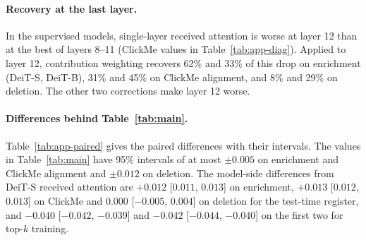 \paragraph{Recovery at the last layer.} In the supervised models, single-layer received attention is worse at layer 12 than at the best of layers 8--11 (ClickMe values in Table~\ref{tab:app-diag}). Applied to layer 12, contribution weighting recovers 62\% and 33\% of this drop on enrichment (DeiT-S, DeiT-B), 31\% and 45\% on ClickMe alignment, and 8\% and 29\% on deletion. The other two corrections make layer 12 worse.

\begin{table}[!htbp]
\caption{Per-layer diagnostics (Fig.~\ref{fig:diag}a--c) and uncorrected ClickMe alignment (last three columns). S, B, D: DeiT-S, DeiT-B, DINO ViT-S; probe chance: 0.5\%.}
\label{tab:app-diag}
\centering

\end{table}

\begin{table}[!tbp]
\caption{Paired differences, layers 9--12: mean with 95\% paired-bootstrap interval and verdict (\textit{h} higher, \textit{c} comparable, \textit{l} lower). Top: against received attention. Bottom: each correction against its matched control.}
\label{tab:app-paired}
\centering

\end{table}

\paragraph{Differences behind Table~\ref{tab:main}.} Table~\ref{tab:app-paired} gives the paired differences with their intervals. The values in Table~\ref{tab:main} have 95\% intervals of at most $\pm0.005$ on enrichment and ClickMe alignment and $\pm0.012$ on deletion. The model-side differences from DeiT-S received attention are $+0.012$ [$0.011$, $0.013$] on enrichment, $+0.013$ [$0.012$, $0.013$] on ClickMe and $0.000$ [$-0.005$, $0.004$] on deletion for the test-time register, and $-0.040$ [$-0.042$, $-0.039$] and $-0.042$ [$-0.044$, $-0.040$] on the first two for top-$k$ training.

